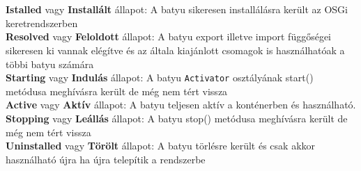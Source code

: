 \\
\\\textbf{Istalled} vagy \textbf{Installált} állapot: A batyu sikeresen installálásra került az OSGi keretrendszerben
\\\textbf{Resolved} vagy \textbf{Feloldott} állapot: A batyu export illetve import függőségei sikeresen ki vannak elégítve és az általa kiajánlott csomagok is használhatóak a többi batyu számára
\\\textbf{Starting} vagy \textbf{Indulás} állapot: A batyu \texttt{Activator} osztályának start() metódusa meghívásra került de még nem tért vissza
\\\textbf{Active} vagy \textbf{Aktív} állapot: A batyu teljesen aktív a konténerben és használható.
\\\textbf{Stopping} vagy \textbf{Leállás} állapot: A batyu stop() metódusa meghívásra került de még nem tért vissza
\\\textbf{Uninstalled} vagy \textbf{Törölt} állapot: A batyu törlésre került és csak akkor használható újra ha újra telepítik a rendszerbe
\\

